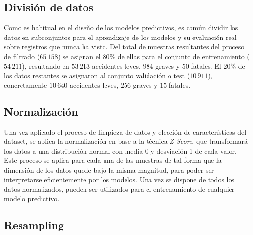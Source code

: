 
\subsection*{División de datos}


Como es habitual en el diseño de los modelos predictivos, es común dividir los datos en subconjuntos para el aprendizaje de los modelos y su evaluación real sobre registros que nunca ha visto. Del total de muestras resultantes del proceso de filtrado ($65\,158$) se asignan el 80\% de ellas para el conjunto de entrenamiento ($54\,211$), resultando en $53\,213$ accidentes leves, $984$ graves y $50$ fatales. El $20\%$ de los datos restantes se asignaron al conjunto validación o test ($10\,911$), concretamente $10\,640$ accidentes leves, $256$ graves y $15$ fatales.

\subsection*{Normalización}



Una vez aplicado el proceso de limpieza de datos y elección de características del dataset, se aplica la normalización en base a la técnica \textit{Z-Score}, que transformará los datos a una distribución normal con media 0 y desviación 1 de cada valor. Este proceso se aplica para cada una de las muestras de tal forma que la dimensión de los datos quede bajo la misma magnitud, para poder ser  interpretarse eficientemente por los modelos. Una vez se dispone de todos los datos normalizados, pueden ser utilizados para el entrenamiento de cualquier modelo predictivo.


\subsection*{Resampling}


